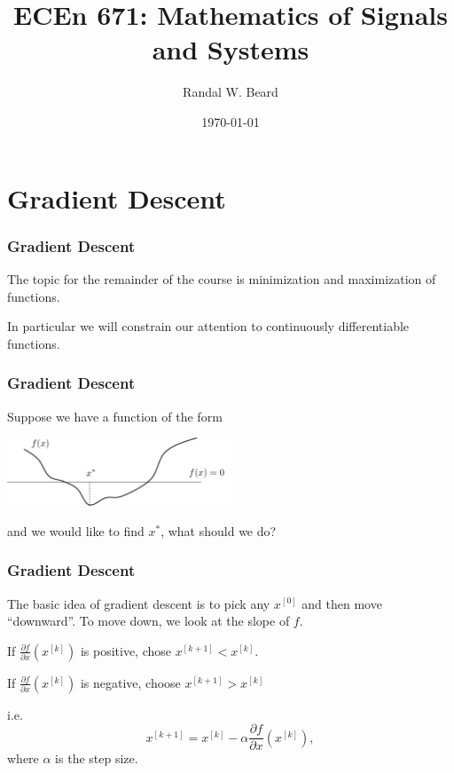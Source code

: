 \documentclass{beamer}
\title{ECEn 671: Mathematics of Signals and Systems}
\author{Randal W. Beard}
\institute{Brigham Young University}
\date{\today}
\begin{document}
\begin{frame}
	\titlepage
\end{frame}

\section{Gradient Descent}
\frame{\sectionpage}


\begin{frame}\frametitle{Gradient Descent}
	The topic for the remainder of the course is minimization and maximization of functions.
	
	\vfill
	
	In particular we will constrain our attention to continuously differentiable functions.
\end{frame}

\begin{frame}\frametitle{Gradient Descent}
	Suppose we have a function of the form
	\begin{center}
		\includegraphics[width=0.5\textwidth]
			{figures/chap14_function_with_minimum}
	\end{center}
	and we would like to find $x^{\ast}$, what should we do?
\end{frame}

\begin{frame}\frametitle{Gradient Descent}
	The basic idea of gradient descent is to pick any $x^{[0]}$ and then move ``downward''.  To move down, we look at the slope of $f$.
	
	\vfill
	
	If $\frac{\partial f}{\partial x}(x^{[k]})$ is positive, chose $x^{[k+1]} < x^{[k]}$.
	
	\vfill
	
	If $\frac{\partial f}{\partial x}(x^{[k]})$ is negative, choose $x^{[k+1]} > x^{[k]}$
	
	\vfill
	
	i.e.
	\[ 
		x^{[k+1]} = x^{[k]} - \alpha \frac{\partial f}{\partial x}(x^{[k]}),
	\]
	where $\alpha$ is the step size.	
\end{frame}
\end{document}
